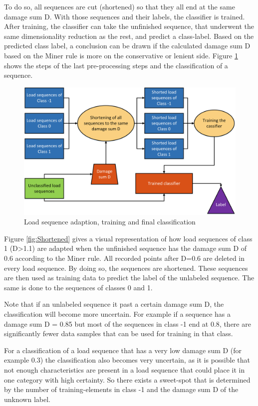 To do so, all sequences are cut (shortened) so that they all end at the same damage sum D. 
With those sequences and their labels, the classifier is trained.
After training, the classifier can take the unfinished sequence, that underwent the same dimensionality reduction as the rest, and predict a class-label. 
Based on the predicted class label, a conclusion can be drawn if the calculated damage sum D based on the Miner rule is more on the conservative or lenient side. Figure \ref{fig:Class} shows the steps of the last pre-processing steps and the classification of a sequence.


\begin{figure}[H]
	\centering
	\includegraphics[width=0.9\linewidth]{IMGs/Class.png}
	\caption{Load sequence adaption, training and final classification }
	\label{fig:Class}
\end{figure}


Figure \ref{fig:Shortened} gives a visual representation of how load sequences of class 1 (D>1.1) are adapted when the unfinished sequence has the damage sum D of 0.6 according to the Miner rule.
All recorded points after D=0.6 are deleted in every load sequence. By doing so, the sequences are shortened. These sequences are then used as training data to predict the label of the unlabeled sequence. The same is done to the sequences of classes 0 and 1.

Note that if an unlabeled sequence it past a certain damage sum D, the classification will become more uncertain. For example if a sequence has a damage sum D = 0.85 but most of the sequences in class -1 end at 0.8, there are significantly fewer data samples that can be used for training in that class. 

For a classification of a load sequence that has a very low damage sum D (for example 0.3) the classification also becomes very uncertain, as it is possible that not enough characteristics are present in a load sequence that could place it in one category with high certainty.
So there exists a sweet-spot that is determined by the number of training-elements in class -1 and the damage sum D of the unknown label.

